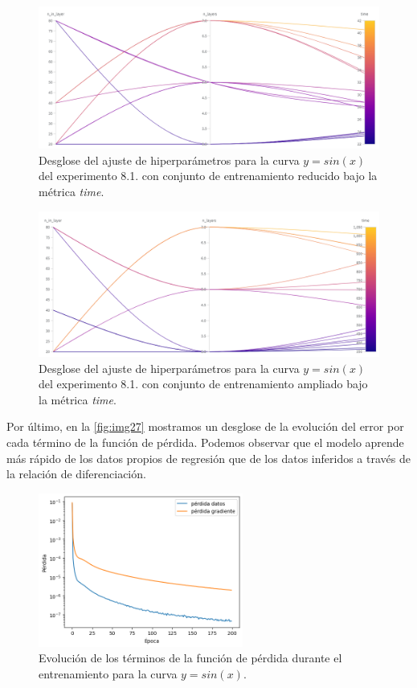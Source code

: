 \begin{figure}[htbp]
    \centering
    \includegraphics[width=1\textwidth]{img/img78.png}
    \caption{Desglose del ajuste de hiperparámetros para la curva $y=sin(x)$ del experimento 8.1. con conjunto de entrenamiento reducido bajo la métrica \textit{time}.}
    \label{fig:img78}
\end{figure}

\begin{figure}[htbp]
    \centering
    \includegraphics[width=1\textwidth]{img/img75.png}
    \caption{Desglose del ajuste de hiperparámetros para la curva $y=sin(x)$ del experimento 8.1. con conjunto de entrenamiento ampliado bajo la métrica \textit{time}.}
    \label{fig:img75}
\end{figure}


Por último, en la \autoref{fig:img27} mostramos un desglose de la evolución del error por cada término de la función de pérdida. Podemos observar que el modelo aprende más rápido de los datos propios de regresión que de los datos inferidos a través de la relación de diferenciación. 

\begin{figure}[htbp]
    \centering
    \includegraphics[width=0.6\textwidth]{img/img27.png}
    \caption{Evolución de los términos de la función de pérdida durante el entrenamiento para la curva $y=sin(x)$.}
    \label{fig:img27}
\end{figure}


